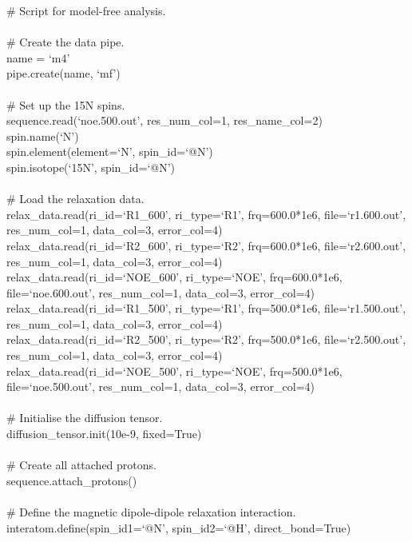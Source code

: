 \begin{htmlonly}
\begin{htmlonly}
\begin{exampleenv}
\# Script for model-free analysis. \\
 \\
\# Create the data pipe. \\
name = `m4' \\
pipe.create(name, `mf') \\
 \\
\# Set up the 15N spins. \\
sequence.read(`noe.500.out', res\_num\_col=1, res\_name\_col=2) \\
spin.name(`N') \\
spin.element(element=`N', spin\_id=`@N') \\
spin.isotope(`15N', spin\_id=`@N') \\
 \\
\# Load the relaxation data. \\
relax\_data.read(ri\_id=`R1\_600',  ri\_type=`R1',  frq=600.0*1e6, file=`r1.600.out', res\_num\_col=1, data\_col=3, error\_col=4) \\
relax\_data.read(ri\_id=`R2\_600',  ri\_type=`R2',  frq=600.0*1e6, file=`r2.600.out', res\_num\_col=1, data\_col=3, error\_col=4) \\
relax\_data.read(ri\_id=`NOE\_600', ri\_type=`NOE', frq=600.0*1e6, file=`noe.600.out', res\_num\_col=1, data\_col=3, error\_col=4) \\
relax\_data.read(ri\_id=`R1\_500',  ri\_type=`R1',  frq=500.0*1e6, file=`r1.500.out', res\_num\_col=1, data\_col=3, error\_col=4) \\
relax\_data.read(ri\_id=`R2\_500',  ri\_type=`R2',  frq=500.0*1e6, file=`r2.500.out', res\_num\_col=1, data\_col=3, error\_col=4) \\
relax\_data.read(ri\_id=`NOE\_500', ri\_type=`NOE', frq=500.0*1e6, file=`noe.500.out', res\_num\_col=1, data\_col=3, error\_col=4) \\
 \\
\# Initialise the diffusion tensor. \\
diffusion\_tensor.init(10e-9, fixed=True) \\
 \\
\# Create all attached protons. \\
sequence.attach\_protons() \\
 \\
\# Define the magnetic dipole-dipole relaxation interaction. \\
interatom.define(spin\_id1=`@N', spin\_id2=`@H', direct\_bond=True) \\

\end{exampleenv}
\end{htmlonly}
\end{htmlonly}

